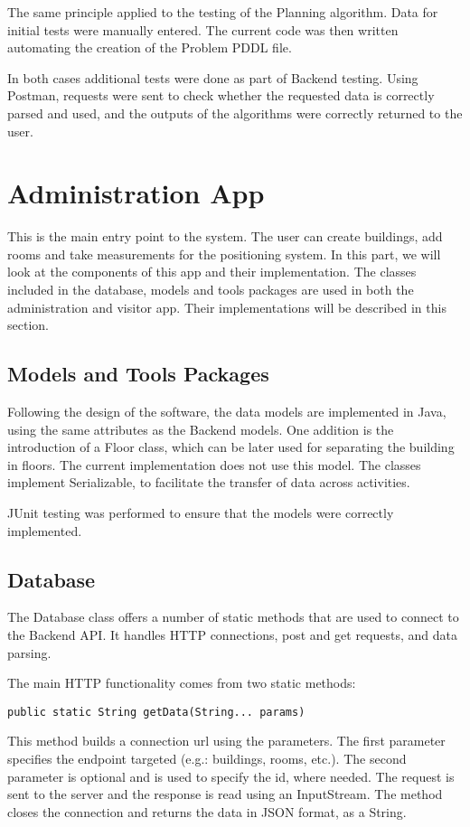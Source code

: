 The same principle applied to the testing of the Planning algorithm. Data for initial tests were manually entered. The current code was then written automating the creation of the Problem PDDL file. 

In both cases additional tests were done as part of Backend testing. Using Postman, requests were sent to check whether the requested data is correctly parsed and used, and the outputs of the algorithms were correctly returned to the user.

\section{Administration App}
This is the main entry point to the system. The user can create buildings, add rooms and take measurements for the positioning system. In this part, we will look at the components of this app and their implementation. The classes included in the database, models and tools packages are used in both the administration and visitor app. Their implementations will be described in this section.

\subsection{Models and Tools Packages}
Following the design of the software, the data models are implemented in Java, using the same attributes as the Backend models. One addition is the introduction of a Floor class, which can be later used for separating the building in floors. The current implementation does not use this model. The classes implement Serializable, to facilitate the transfer of data across activities. 

JUnit testing was performed to ensure that the models were correctly implemented. 
\subsection{Database}
The Database class offers a number of static methods that are used to connect to the Backend API. It handles HTTP connections, post and get requests, and data parsing.

\noindent
The main HTTP functionality comes from two static methods:

\begin{lstlisting}
public static String getData(String... params)
\end{lstlisting}
This method builds a connection url using the parameters. The first parameter specifies the endpoint targeted (e.g.: buildings, rooms, etc.). The second parameter is optional and is used to specify the id, where needed. The request is sent to the server and the response is read using an InputStream. The method closes the connection and returns the data in JSON format, as a String.

